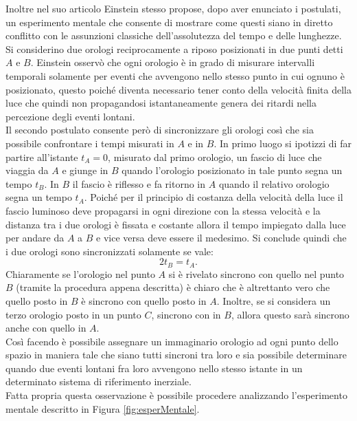 Inoltre nel suo articolo Einstein stesso propose, dopo aver enunciato i postulati, un esperimento mentale che consente di mostrare come questi siano in diretto conflitto con le assunzioni classiche dell'assolutezza del tempo e delle lunghezze. Si considerino due orologi reciprocamente a riposo posizionati in due punti detti $A$ e $B$. Einstein osservò che ogni orologio è in grado di misurare intervalli temporali solamente per eventi che avvengono nello stesso punto in cui ognuno è posizionato, questo poiché diventa necessario tener conto della velocità finita della luce che quindi non propagandosi istantaneamente genera dei ritardi nella percezione degli eventi lontani.\\ Il secondo postulato consente però di sincronizzare gli orologi così che sia possibile confrontare i tempi misurati in $A$ e in $B$. In primo luogo si ipotizzi di far partire all'istante $t_A=0$, misurato dal primo orologio, un fascio di luce che viaggia da $A$ e giunge in $B$ quando l'orologio posizionato in tale punto segna un tempo $t_B$. In $B$ il fascio è riflesso e fa ritorno in $A$ quando il relativo orologio segna un tempo $t_A$. Poiché per il principio di costanza della velocità della luce il fascio luminoso deve propagarsi in ogni direzione con la stessa velocità e la distanza tra i due orologi è fissata e costante allora il tempo impiegato dalla luce per andare da $A$ a $B$ e vice versa deve essere il medesimo. Si conclude quindi che i due orologi sono sincronizzati solamente se vale:
\begin{equation}
    2t_B=t_A.
    \label{SinconizazioneOrologi}
\end{equation}
Chiaramente se l'orologio nel punto $A$ si è rivelato sincrono con quello nel punto $B$ (tramite la procedura appena descritta) è chiaro che è altrettanto vero che quello posto in $B$ è sincrono con quello posto in $A$. Inoltre, se si considera un terzo orologio posto in un punto $C$, sincrono con in $B$, allora questo sarà sincrono anche con quello in $A$.\\Così facendo è possibile assegnare un immaginario orologio ad ogni punto dello spazio in maniera tale che siano tutti sincroni tra loro e sia possibile determinare quando due eventi lontani fra loro avvengono nello stesso istante in un determinato sistema di riferimento inerziale.\\
Fatta propria questa osservazione è possibile procedere analizzando l'esperimento mentale descritto in Figura \ref{fig:esperMentale}.
